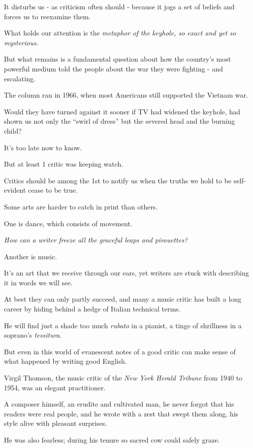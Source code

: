 \documentclass{book}
\numberwithin{equation}{section}
\begin{document}
It disturbs us - as criticism often should - because it jogs a set of beliefs and forces us to reexamine them.

What holds our attention is the \textit{metaphor of the keyhole, so exact and yet so mysterious}.

But what remains is a fundamental question about how the country's most powerful medium told the people about the war they were fighting - and escalating.

The column ran in 1966, when most Americans still supported the Vietnam war.

Would they have turned against it sooner if TV had widened the keyhole, had shown us not only the ``swirl of dress'' but the severed head and the burning child?

It's too late now to know.

But at least 1 critic was keeping watch.

Critics should be among the 1st to notify us when the truths we hold to be self-evident cease to be true.

%
Some arts are harder to catch in print than others.

One is dance, which consists of movement.

\textit{How can a writer freeze all the graceful leaps and pirouettes?}

Another is music.

It's an art that we receive through our ears, yet writers are stuck with describing it in words we will see.

At best they can only partly succeed, and many a music critic has built a long career by hiding behind a hedge of Italian technical terms.

He will find just a shade too much \textit{rubato} in a pianist, a tinge of shrillness in a soprano's \textit{tessitura}.

%
But even in this world of evanescent notes of a good critic can make sense of what happened by writing good English.

Virgil Thomson, the music critic of the \textit{New York Herald Tribune} from 1940 to 1954, was an elegant practitioner.

A composer himself, an erudite and cultivated man, he never forgot that his readers were real people, and he wrote with a zest that swept them along, his style alive with pleasant surprises.

He was also fearless; during his tenure so sacred cow could safely graze.
\end{document}
